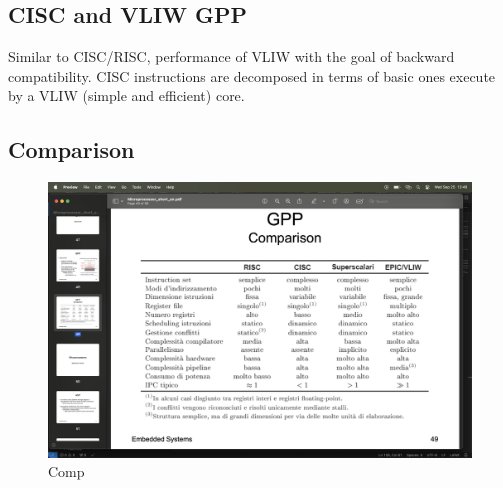 \subsection{CISC and VLIW GPP}
Similar to CISC/RISC, performance of VLIW with the goal of backward compatibility.
CISC instructions are decomposed in terms of basic ones execute by a VLIW (simple and efficient) core.

\subsection{Comparison}
\begin{figure}[H]
    \centering
    \includegraphics[width=0.75\linewidth]{images/comparison.png}
    \caption{Comp}
\end{figure}
